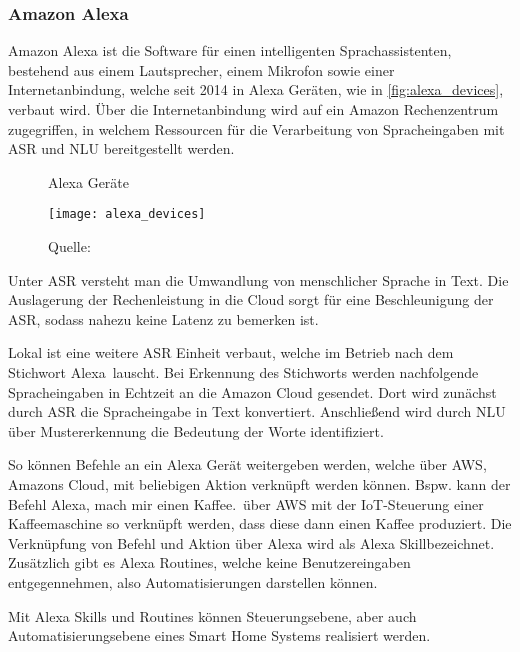 \subsubsection{Amazon Alexa}

Amazon Alexa ist die Software für einen intelligenten Sprachassistenten, bestehend aus einem Lautsprecher, einem Mikrofon sowie einer Internetanbindung, welche seit 2014 in Alexa Geräten, wie in \autoref{fig:alexa_devices}, verbaut wird.
Über die Internetanbindung wird auf ein Amazon Rechenzentrum zugegriffen, in welchem Ressourcen für die Verarbeitung von Spracheingaben mit \ac{ASR} und \ac{NLU} bereitgestellt werden.

\begin{figure}[ht]
	\centering
	\caption{Alexa Geräte}
	\texttt{[image: alexa\_devices]}
	\caption*{\footnotesize{Quelle: }}
	\label{fig:alexa_devices}
\end{figure}

Unter \ac{ASR} versteht man die Umwandlung von menschlicher Sprache in Text.
Die Auslagerung der Rechenleistung in die Cloud sorgt für eine Beschleunigung der \ac{ASR}, sodass nahezu keine Latenz zu bemerken ist.

Lokal ist eine weitere \ac{ASR} Einheit verbaut, welche im Betrieb nach dem Stichwort \glqq Alexa\grqq \ lauscht.
Bei Erkennung des Stichworts werden nachfolgende Spracheingaben in Echtzeit an die Amazon Cloud gesendet.
Dort wird zunächst durch \ac{ASR} die Spracheingabe in Text konvertiert.
Anschließend wird durch \ac{NLU} über Mustererkennung die Bedeutung der Worte identifiziert. 

So können Befehle an ein Alexa Gerät weitergeben werden, welche über \ac{AWS}, Amazons Cloud, mit beliebigen Aktion verknüpft werden können.
Bspw. kann der Befehl \glqq Alexa, mach mir einen Kaffee.\grqq \ über \ac{AWS} mit der \ac{IoT}-Steuerung einer Kaffeemaschine so verknüpft werden, dass diese dann einen Kaffee produziert.
Die Verknüpfung von Befehl und Aktion über Alexa wird als \glqq Alexa Skill\grqq bezeichnet.
Zusätzlich gibt es \glqq Alexa Routines\grqq, welche keine Benutzereingaben entgegennehmen, also Automatisierungen darstellen können.

Mit Alexa Skills und Routines können Steuerungsebene, aber auch Automatisierungsebene eines Smart Home Systems realisiert werden.

